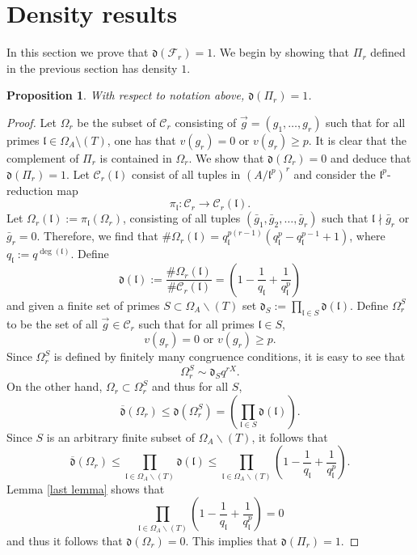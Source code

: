 \documentclass[11pt]{amsart}
\newtheorem{proposition}[theorem]{Proposition}
\newcommand{\cF}{\mathcal{F}}
\newcommand{\fl}{\mathfrak{l}}
\newcommand{\cC}{\mathcal{C}}
\newcommand{\op}[1]{\operatorname{#1}}
\numberwithin{equation}{section}
\begin{document}
\section{Density results}\label{s 6}

\par In this section we prove that $\mathfrak{d}(\cF_r)=1$. We begin by showing that $\Pi_r$ defined in the previous section has density $1$.

\begin{proposition}\label{Pi r has density 1}
    With respect to notation above, $\mathfrak{d}(\Pi_r)=1$.
\end{proposition}
\begin{proof}

\par Let $\Omega_r$ be the subset of $\cC_r$ consisting of $\vec{g}=(g_1, \dots, g_r)$ such that for all primes $\mathfrak{l}\in \Omega_A\setminus (T) $, one has that $ v(g_r)=0$ or $v(g_r)\geq p$. It is clear that the complement of $\Pi_r$ is contained in $\Omega_r$. We show that $\mathfrak{d}(\Omega_r)=0$ and deduce that $\mathfrak{d}(\Pi_r)=1$. Let $\cC_r(\mathfrak{l})$ consist of all tuples in $(A/\mathfrak{l}^p)^r$ and consider the $\fl^p$-reduction map 
\[\pi_{\fl} :\cC_r\rightarrow \cC_r(\mathfrak{l}).\]
Let $\Omega_r(\mathfrak{l}):=\pi_{\fl}\left(\Omega_r\right)$, consisting of all tuples $(\bar{g}_1, \bar{g}_2, \dots, \bar{g}_r)$ such that $\mathfrak{l}\nmid \bar{g}_{r}$ or $\bar{g}_r=0$. Therefore, we find that $\# \Omega_r(\fl)=q_{\fl}^{p(r-1)}\left(q_{\fl}^p-q_{\fl}^{p-1}+1\right)$, where $q_\fl:=q^{\op{deg}(\fl)}$. Define
\[\mathfrak{d}(\fl):=\frac{\# \Omega_r(\fl)}{\# \cC_r(\fl)}=\left(1-\frac{1}{q_{\fl}}+\frac{1}{q_{\fl}^p}\right)\]
and given a finite set of primes $S\subset \Omega_A\backslash (T)$ set $\mathfrak{d}_S:=\prod_{\fl\in S} \mathfrak{d}(\fl)$. Define $\Omega_r^S$ to be the set of all $\vec{g}\in \cC_r$ such that for all primes $\fl\in S$,  \[v(g_r)=0\text{ or }v(g_r)\geq p.\]
Since $\Omega_r^S$ is defined by finitely many congruence conditions, it is easy to see that 
\[\Omega_r^S\sim \mathfrak{d}_S q^{rX}. \]
On the other hand, $\Omega_r\subset \Omega_r^S$ and thus for all $S$, 
\[\overline{\mathfrak{d}}(\Omega_r)\leq \mathfrak{d}(\Omega_r^S)=\left(\prod_{\fl\in S} \mathfrak{d}(\fl)\right).\]
Since $S$ is an arbitrary finite subset of $\Omega_A\backslash (T)$, it follows that 
\[\overline{\mathfrak{d}}(\Omega_r)\leq \prod_{\fl\in \Omega_A\backslash (T)}\mathfrak{d}(\fl)\leq \prod_{\fl\in \Omega_A\backslash (T)}\left(1-\frac{1}{q_{\fl}}+\frac{1}{q_{\fl}^p}\right). \]
Lemma \ref{last lemma} shows that 
\[\prod_{\fl\in \Omega_A\backslash (T)}\left(1-\frac{1}{q_{\fl}}+\frac{1}{q_{\fl}^p}\right)=0\] and thus it follows that $\mathfrak{d}(\Omega_r)=0$. This implies that $\mathfrak{d}(\Pi_r)=1$.
\end{proof}
\end{document}
